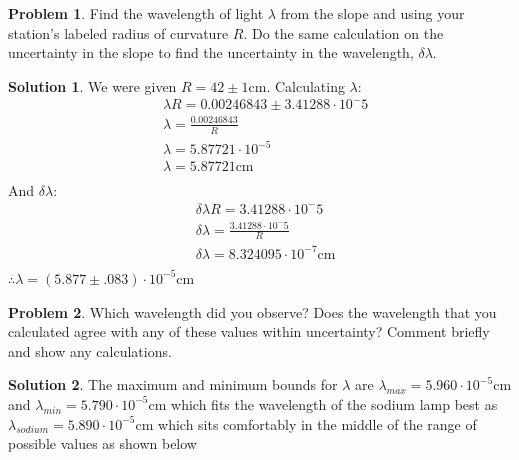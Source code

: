 \documentclass[10pt]{article}
\theoremstyle{definition}
\newtheorem{problem}{Problem}
\newtheorem{soln}{Solution}
\begin{document}
\begin{problem}
Find the wavelength of light $\lambda$ from the slope and using your station's labeled radius of curvature $R$.
Do the same calculation on the uncertainty in the slope to find the uncertainty in the wavelength, $\delta\lambda$.
\end{problem}
\begin{soln}
  We were given $R=42 \pm 1 \text{cm}$. Calculating $\lambda$:
  \begin{align*}
     & \lambda R = 0.00246843\pm3.41288\cdot 10^-5 \\
     & \lambda = \frac{0.00246843}{R}              \\
     & \lambda = 5.87721\cdot 10^{-5}              \\
     & \lambda = 5.87721 \text{cm}                 \\
  \end{align*}
  And $\delta\lambda$:
  \begin{align*}
     & \delta\lambda R = 3.41288\cdot 10^-5             \\
     & \delta\lambda = \frac{3.41288\cdot 10^-5 }{R}    \\
     & \delta\lambda = 8.324095 \cdot 10^{-7} \text{cm} \\
  \end{align*}
  $\therefore \lambda = (5.877 \pm .083)\cdot 10^{-5}\text{cm}$
\end{soln}


\begin{problem}
Which wavelength did you observe? Does the wavelength that you calculated agree with any of these values within uncertainty? Comment briefly and show any calculations.
\end{problem}
\begin{soln}
  The maximum and minimum bounds for $\lambda$ are $\lambda_{max}=5.960\cdot10^{-5}$cm and $\lambda_{min}=5.790\cdot10^{-5}$cm which fits the wavelength of the sodium lamp best
  as $\lambda_{sodium}=5.890\cdot 10^{-5}$cm which sits comfortably in the middle of the range of possible values as shown below

\end{soln}
\end{document}
